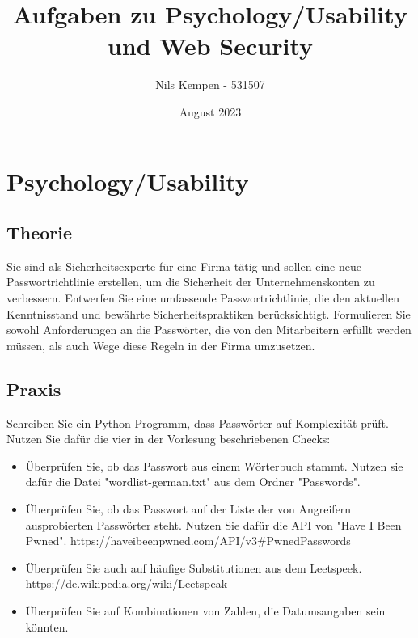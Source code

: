 \documentclass[ngerman]{article}
\title{Aufgaben zu Psychology/Usability und Web Security}
\author{Nils Kempen - 531507}
\date{August 2023}
\begin{document}
\maketitle


\section{Psychology/Usability}

\subsection{Theorie}
Sie sind als Sicherheitsexperte für eine Firma tätig und sollen eine neue Passwortrichtlinie erstellen, um die Sicherheit der Unternehmenskonten zu verbessern. Entwerfen Sie eine umfassende Passwortrichtlinie, die den aktuellen Kenntnisstand und bewährte Sicherheitspraktiken berücksichtigt.
Formulieren Sie sowohl Anforderungen an die Passwörter, die von den Mitarbeitern erfüllt werden müssen, als auch Wege diese Regeln in der Firma umzusetzen.

\subsection{Praxis}
Schreiben Sie ein Python Programm, dass Passwörter auf Komplexität prüft. Nutzen Sie dafür die vier in der Vorlesung beschriebenen Checks: 

\begin{itemize}
    \item Überprüfen Sie, ob das Passwort aus einem Wörterbuch stammt. Nutzen sie dafür die Datei "wordlist-german.txt" aus dem Ordner "Passwords".
    \item Überprüfen Sie, ob das Passwort auf der Liste der von Angreifern ausprobierten Passwörter steht. Nutzen Sie dafür die API von "Have I Been Pwned". https://haveibeenpwned.com/API/v3\#PwnedPasswords
    \item Überprüfen Sie auch auf häufige Substitutionen aus dem Leetspeek. https://de.wikipedia.org/wiki/Leetspeak
    \item Überprüfen Sie auf Kombinationen von Zahlen, die Datumsangaben sein könnten.
\end{itemize}
\end{document}
